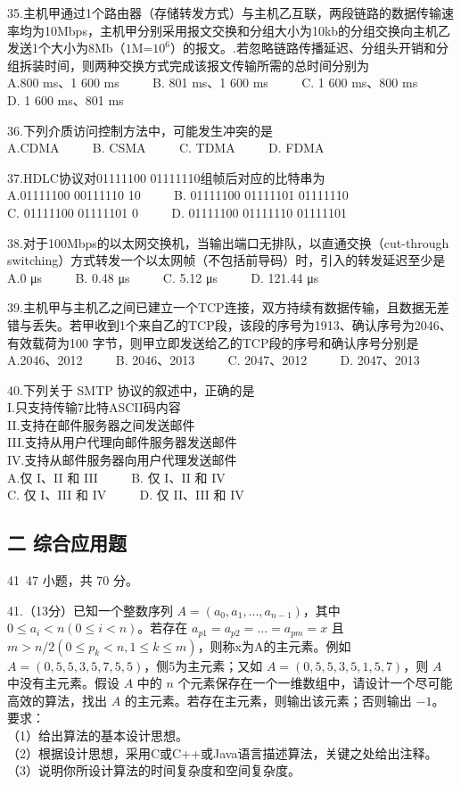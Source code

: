 35.主机甲通过1个路由器（存储转发方式）与主机乙互联，两段链路的数据传输速率均为10Mbps，主机甲分别采用报文交换和分组大小为10kb的分组交换向主机乙发送1个大小为8Mb（$1$M=$10^6$）的报文。.若忽略链路传播延迟、分组头开销和分组拆装时间，则两种交换方式完成该报文传输所需的总时间分别为 \\
A.800 ms、1 600 ms $\qquad$ B. 801 ms、1 600 ms $\qquad$ C. 1 600 ms、800 ms $\qquad$ D. 1 600 ms、801 ms

36.下列介质访问控制方法中，可能发生冲突的是 \\
A.CDMA $\qquad$ B. CSMA $\qquad$ C. TDMA $\qquad$ D. FDMA 

37.HDLC协议对01111100 01111110组帧后对应的比特串为 \\
A.01111100 00111110 10 $\qquad$ B. 01111100 01111101 01111110  \\
C. 01111100 01111101 0 $\qquad$ D. 01111100 01111110 01111101 

38.对于100Mbps的以太网交换机，当输出端口无排队，以直通交换（cut-through switching）方式转发一个以太网帧（不包括前导码）时，引入的转发延迟至少是 \\
A.0 μs $\qquad$ B. 0.48 μs $\qquad$ C. 5.12 μs $\qquad$ D. 121.44 μs

39.主机甲与主机乙之间已建立一个TCP连接，双方持续有数据传输，且数据无差错与丢失。若甲收到1个来自乙的TCP段，该段的序号为1913、确认序号为2046、有效载荷为100 字节，则甲立即发送给乙的TCP段的序号和确认序号分别是 \\
A.2046、2012 $\qquad$ B. 2046、2013 $\qquad$ C. 2047、2012 $\qquad$ D. 2047、2013

40.下列关于 SMTP 协议的叙述中，正确的是 \\
I.只支持传输7比特ASCII码内容 \\
II.支持在邮件服务器之间发送邮件 \\
III.支持从用户代理向邮件服务器发送邮件 \\
IV.支持从邮件服务器向用户代理发送邮件 \\
A.仅 I、II 和 III $\qquad$ B. 仅 I、II 和 IV \\
C. 仅 I、III 和 IV $\qquad$ D. 仅 II、III 和 IV

\subsection{二 综合应用题}
41~47 小题，共 70 分。

41.（13分）已知一个整数序列 $A=(a_0, a_1,...,a_{n-1})$，其中 $0 \leq a_i<n(0 \leq i < n)$。若存在 $a_{p1}=a_{p2}=...=a_{pm}=x$ 且 $m>n/2(0 \leq p_k < n, 1 \leq k \leq m)$，则称x为A的主元素。例如 $A=(0,5,5,3,5,7,5,5)$，侧5为主元素；又如 $A=(0,5,5,3,5,1,5,7)$，则 $A$ 中没有主元素。假设 $A$ 中的 $n$ 个元素保存在一个一维数组中，请设计一个尽可能高效的算法，找出 $A$ 的主元素。若存在主元素，则输出该元素；否则输出 $-1$。要求： \\
（1）给出算法的基本设计思想。 \\
（2）根据设计思想，采用C或C++或Java语言描述算法，关键之处给出注释。 \\
（3）说明你所设计算法的时间复杂度和空间复杂度。

